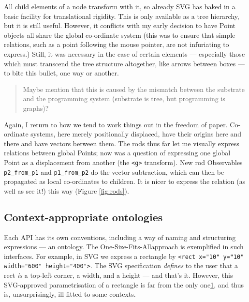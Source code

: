 All child elements of a node transform with it, so already SVG has baked
in a basic facility for translational rigidity. This is only available
as a tree hierarchy, but it is still useful. However, it conflicts with
my early decision to have Point objects all share the global co-ordinate
system (this was to ensure that simple relations, such as a point
following the mouse pointer, are not infuriating to express.) Still, it
was necessary in the case of certain elements --- especially those which
must transcend the tree structure altogether, like arrows between boxes
--- to bite this bullet, one way or another.

\begin{quote}
Maybe mention that this is caused by the mismatch between the substrate
and the programming system (substrate is tree, but programming is
graphs)?
\end{quote}

Again, I return to how we tend to work things out in the freedom of
paper. Co-ordinate systems, here merely positionally displaced, have
their origins here and there and have vectors between them. The rods
thus far let me visually express relations between global Points; now
was a question of expressing one global Point as a displacement from
another (the \texttt{\textless{}g\textgreater{}} transform). New rod
Observables \texttt{p2\_from\_p1} and \texttt{p1\_from\_p2} do the
vector subtraction, which can then be propagated as local co-ordinates
to children. It is nicer to express the relation (as well as see it!)
this way (Figure \ref{fig:rods}).

\hypertarget{context-appropriate-ontologies}{%
\subsection{Context-appropriate
ontologies}\label{context-appropriate-ontologies}}

Each API has its own conventions, including a way of naming and
structuring expressions --- an ontology. The One-Size-Fits-Allapproach
is exemplified in such interfaces. For example, in SVG we express a
rectangle by
\texttt{\textless{}rect x="10" y="10" width="600" height="400"\textgreater{}}.
The SVG specification \emph{defines} to the user that a rect \emph{is} a
top-left corner, a width, and a height --- and that's it. However, this
SVG-approved parametrisation of a rectangle is far from the only
one\href{https://www.shift-society.org/salon/papers/2018/critiques/critique-semprola.pdf}{1},
and thus is, unsurprisingly, ill-fitted to some contexts.


